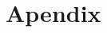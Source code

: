 \documentclass[11pt]{article}
\begin{document}
    \clearpage
    
\section{Apendix}
\label{sec:apx}
\end{document}
